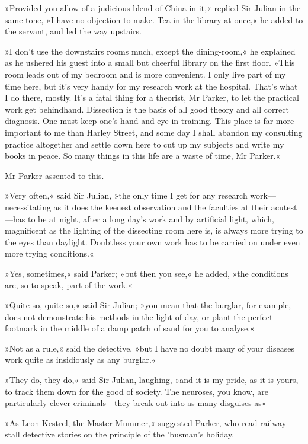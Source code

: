 »Provided you allow of a judicious blend of China in it,« replied Sir Julian in the same tone, »I have no objection to make. Tea in the library at once,« he added to the servant, and led the way upstairs.

»I don't use the downstairs rooms much, except the dining-room,« he explained as he ushered his guest into a small but cheerful library on the first floor. »This room leads out of my bedroom and is more convenient. I only live part of my time here, but it's very handy for my research work at the hospital. That's what I do there, mostly. It's a fatal thing for a theorist, Mr Parker, to let the practical work get behindhand. Dissection is the basis of all good theory and all correct diagnosis. One must keep one's hand and eye in training. This place is far more important to me than Harley Street, and some day I shall abandon my consulting practice altogether and settle down here to cut up my subjects and write my books in peace. So many things in this life are a waste of time, Mr Parker.«

Mr Parker assented to this.

»Very often,« said Sir Julian, »the only time I get for any research work\allowbreak---\allowbreak necessitating as it does the keenest observation and the faculties at their acutest\allowbreak---\allowbreak has to be at night, after a long day's work and by artificial light, which, magnificent as the lighting of the dissecting room here is, is always more trying to the eyes than daylight. Doubtless your own work has to be carried on under even more trying conditions.«

»Yes, sometimes,« said Parker; »but then you see,« he added, »the conditions are, so to speak, part of the work.«

»Quite so, quite so,« said Sir Julian; »you mean that the burglar, for example, does not demonstrate his methods in the light of day, or plant the perfect footmark in the middle of a damp patch of sand for you to analyse.«

»Not as a rule,« said the detective, »but I have no doubt many of your diseases work quite as insidiously as any burglar.«

»They do, they do,« said Sir Julian, laughing, »and it is my pride, as it is yours, to track them down for the good of society. The neuroses, you know, are particularly clever criminals\allowbreak---\allowbreak they break out into as many disguises as\longdash«

»As Leon Kestrel, the Master-Mummer,« suggested Parker, who read railway-stall detective stories on the principle of the 'busman's holiday.

